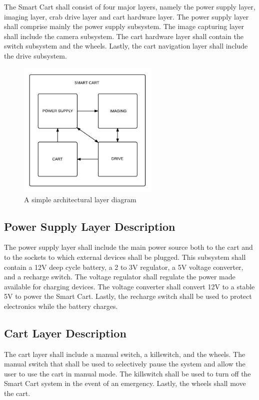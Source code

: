 The Smart Cart shall consist of four major layers, namely the power supply layer, imaging layer, crab drive layer and cart hardware layer. The power supply layer shall comprise mainly the power supply subsystem. The image capturing layer shall include the camera subsystem. The cart hardware layer shall contain the switch subsystem and the wheels. Lastly, the cart navigation layer shall include the drive subsystem.

\begin{figure}[h!]
	\centering
 	\includegraphics[width=0.60\textwidth]{images/system_overview}
 \caption{A simple architectural layer diagram}
\end{figure}


\subsection{Power Supply Layer Description}
The power supply layer shall include the main power source both to the cart and to the sockets to which external devices shall be plugged. This subsystem shall contain a 12V deep cycle battery, a 2 to 3V regulator, a 5V voltage converter, and a recharge switch. The voltage regulator shall regulate the power made available for charging devices. The voltage converter shall convert 12V to a stable 5V to power the Smart Cart. Lastly, the recharge switch shall be used to protect electronics while the battery charges.

\subsection{Cart Layer Description}
The cart layer shall include a manual switch, a killswitch, and the wheels. The manual switch that shall be used to selectively pause the system and allow the user to use the cart in manual mode. The killswitch shall be used to turn off the Smart Cart system in the event of an emergency. Lastly, the wheels shall move the cart.

